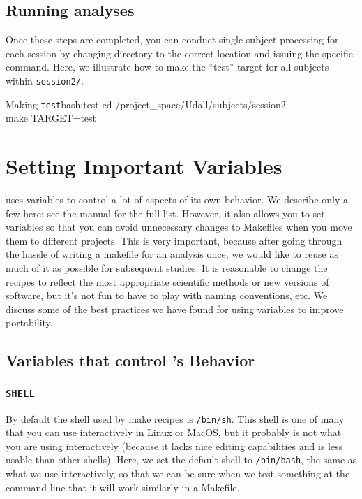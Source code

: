 \subsection{Running analyses}
Once these steps are completed, you can conduct single-subject processing for each session by changing directory to the correct location and issuing the specific \maken{} command. Here, we illustrate how to make the ``test'' target for all subjects within \texttt{session2/}.

\begin{bash}{Making \texttt{test}}{bash:test}
	cd /project_space/Udall/subjects/session2 \\
	make TARGET=test
\end{bash}

\section{Setting Important Variables}

\maken{} uses variables to control a lot of aspects of its own behavior. We describe only a few here; see the manual for the full list. However, it also allows you to set variables so that you can avoid unnecessary changes to Makefiles when you move them to different projects. This is very important, because after going through the hassle of writing a makefile for an analysis once, we would like to reuse as much of it as possible for subsequent studies. It is reasonable to change the recipes to reflect the most appropriate scientific methods or new versions of software, but it's not fun to have to play with naming conventions, etc. We discuss some of the best practices we have found for using variables to improve portability.

\subsection{Variables that control \maken's Behavior}

\subsubsection{\texttt{SHELL}}
By default the shell used by make recipes is \texttt{/bin/sh}.  This shell is one of many that you can use interactively in Linux or MacOS, but it probably is not what you are using interactively (because it lacks nice editing capabilities and is less usable than other shells). Here, we set the default shell to \texttt{/bin/bash}, the same as what we use interactively, so that we can be sure when we test something at the command line that it will work similarly in a Makefile.

